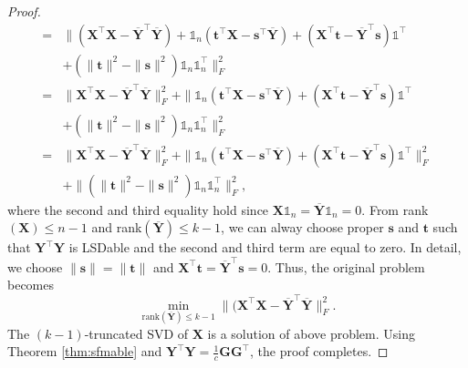 \documentclass[journal]{IEEEtran}
\begin{document}
\begin{proof}
\[\begin{aligned}
	=& \|(\mathbf{X}^\top\mathbf{X}-\overline{\mathbf{Y}}^\top\overline{\mathbf{Y}}) + \mathbb{1}_n(\mathbf{t}^\top \mathbf{X} - \mathbf{s}^\top\overline{\mathbf{Y}}) + (\mathbf{X}^\top\mathbf{t} - \overline{\mathbf{Y}}^\top\mathbf{s})\mathbb{1}^\top \\
	&+ (\|\mathbf{t}\|^2 - \|\mathbf{s}\|^2)\mathbb{1}_n\mathbb{1}_n^\top  \|_F^2 \\
	=& \| \mathbf{X}^\top\mathbf{X}-\overline{\mathbf{Y}}^\top\overline{\mathbf{Y}} \|_F^2 + \| \mathbb{1}_n(\mathbf{t}^\top \mathbf{X} - \mathbf{s}^\top\overline{\mathbf{Y}}) + (\mathbf{X}^\top\mathbf{t} - \overline{\mathbf{Y}}^\top\mathbf{s})\mathbb{1}^\top\\
	&+ (\|\mathbf{t}\|^2 - \|\mathbf{s}\|^2)\mathbb{1}_n\mathbb{1}_n^\top \|_F^2 \\
	=& \| \mathbf{X}^\top\mathbf{X}-\overline{\mathbf{Y}}^\top\overline{\mathbf{Y}} \|_F^2 + \| \mathbb{1}_n(\mathbf{t}^\top \mathbf{X} - \mathbf{s}^\top\overline{\mathbf{Y}}) + (\mathbf{X}^\top\mathbf{t} - \overline{\mathbf{Y}}^\top\mathbf{s})\mathbb{1}^\top \|_F^2\\
	&+ \|(\|\mathbf{t}\|^2 - \|\mathbf{s}\|^2)\mathbb{1}_n\mathbb{1}_n^\top \|_F^2,
	\end{aligned}
	\]
	where the second and third equality hold since $\mathbf{X}\mathbb{1}_n=\overline{\mathbf{Y}}\mathbb{1}_n = 0$.
	From rank$(\mathbf{X})\leq n-1$ and rank$(\overline{\mathbf{Y}})\leq k-1$, we can alway choose proper $\mathbf{s}$ and $\mathbf{t}$ such that $\mathbf{Y}^\top\mathbf{Y}$ is LSDable and the second and third term are equal to zero. In detail, we choose $\|\mathbf{s}\|=\|\mathbf{t}\|$ and $\mathbf{X}^\top\mathbf{t}=\overline{\mathbf{Y}}^\top\mathbf{s}=0$. Thus, the original problem becomes
	\[
	\min_{\text{rank}(\overline{\mathbf{Y}})\leq k-1}  
	\|(\mathbf{X}^\top\mathbf{X} - \overline{\mathbf{Y}}^\top\overline{\mathbf{Y}} \|_F^2.
	\]
	The $(k-1)$-truncated SVD of $\mathbf{X}$ is a solution of above problem. Using Theorem \ref{thm:sfmable} and $\mathbf{Y}^\top\mathbf{Y} = \frac{1}{c}\mathbf{G}\mathbf{G}^\top$, the proof completes.
\end{proof}
%
%
%
%
%
%
%
\end{document}
